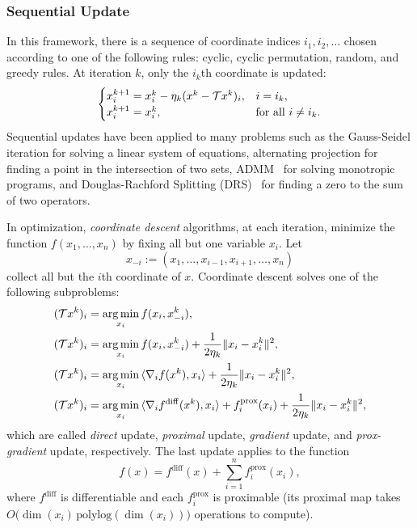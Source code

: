 \subsubsection{Sequential Update} In this framework, there is a sequence of coordinate indices $i_1,i_2,\ldots$ chosen according to one of the following rules: cyclic, cyclic permutation, random, and greedy rules. At  iteration $k$, only the $i_k$th coordinate is updated:
$$ \begin{cases}
x^{k+1}_{i} = x_{i}^k - \eta_k(x^k-\cT x^k)_{i},& i=i_k,\\
x^{k+1}_{i} = x_i^k,&\text{for all } i\not= i_k.
\end{cases}
$$
Sequential updates have been applied to many problems such as the Gauss-Seidel iteration for solving a linear system of equations, alternating projection \cite{von1949rings,bauschke1993convergence} for finding a point in the intersection of two sets,  ADMM~\cite{glowinski1975ADMM, gabay1976ADMM} for solving monotropic programs, and Douglas-Rachford Splitting (DRS)~\cite{douglas1956DRS}  for finding a zero to the sum of two operators. %

In optimization,  \emph{coordinate descent} algorithms, at each iteration, minimize the function $f(x_1,\ldots,x_n)$ by fixing all but one variable $x_i$. Let $$x_{-i}:=(x_1,\ldots,x_{i-1},x_{i+1},\ldots,x_n)$$
collect all but the $i$th coordinate of $x$. Coordinate descent solves one of the following subproblems:
\begin{subequations}\label{coordes}
\begin{align}
(\cT x^k)_i & = \argmin_{x_i}f(x_i,x_{-i}^k),\\
(\cT x^k)_i & = \argmin_{x_i}f(x_i,x_{-i}^k)+\frac{1}{2\eta_k}\|x_i-x_i^k\|^2,\\
(\cT x^k)_i & = \argmin_{x_i}\,\langle \nabla_i f(x^k),x_i \rangle+\frac{1}{2\eta_k}\|x_i-x_i^k\|^2,\\
(\cT x^k)_i & = \argmin_{x_i}\,\langle \nabla_i f^{\mathrm{diff}}(x^k),x_i \rangle+f_i^{\mathrm{prox}}(x_i)+\frac{1}{2\eta_k}\|x_i-x_i^k\|^2,
\end{align}
\end{subequations}
which are called \emph{direct} update, \emph{proximal} update,  \emph{gradient} update, and \emph{prox-gradient} update, respectively. The last update applies to the function $$f(x) = f^{\mathrm{diff}}(x)+\sum_{i=1}^nf^{\mathrm{prox}}_i(x_i),$$ where $f^{\mathrm{diff}}$ is differentiable and each $f^{\mathrm{prox}}_i$ is proximable (its proximal map takes $O\big(\dim(x_i)\,\mathrm{polylog}(\dim(x_i))\big)$ operations to compute).

